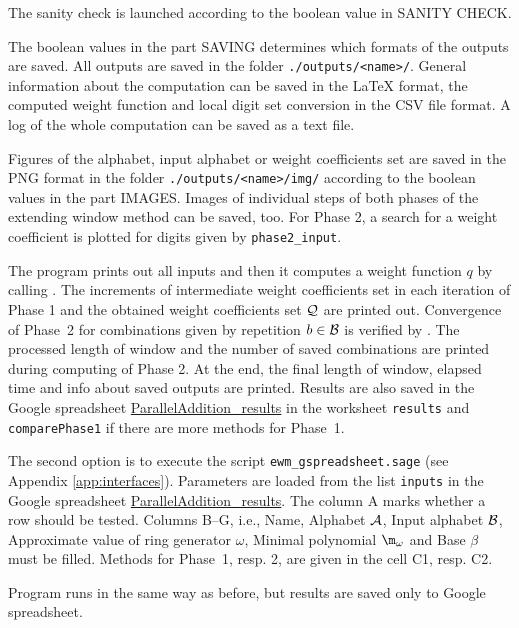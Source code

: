 The sanity check is launched according to the boolean value in SANITY CHECK. 

The boolean values in the part SAVING determines which formats of the outputs are saved. All outputs are saved in the folder \verb+./outputs/<name>/+. General information about the computation can be saved in the \LaTeX{} format, the computed weight function and local digit set conversion in the CSV file format.  A log of the whole computation can be saved as a text file.

Figures of the alphabet, input alphabet or weight coefficients set are saved in the PNG format in the folder \verb+./outputs/<name>/img/+ according to the boolean values in the part IMAGES. Images of individual steps of both phases of the extending window method can be saved, too. For Phase 2, a search for a weight coefficient  is plotted for digits given by \verb+phase2_input+.  

The program prints out all inputs and then it computes a weight function $q$ by calling . The increments of intermediate weight coefficients set in each iteration of Phase 1 and the obtained weight coefficients set $\mathcal{Q}$ are printed out. Convergence of Phase~2 for combinations given by repetition $b\in\mathcal{B}$ is verified by . The processed length of window and the number of saved combinations are printed during computing of Phase 2. At the end, the final length of window, elapsed time and info about saved outputs are printed. Results are also saved in the Google spreadsheet \href{https://docs.google.com/spreadsheets/d/1TnhrHdefHfHa0WSeVs4q6XVj3epjPlPlnoekE0E1xeM/edit?usp=sharing}{ParallelAddition\_results} in the worksheet \verb+results+ and \verb+comparePhase1+ if there are more methods for Phase~1.

The second option is to execute the script \verb+ewm_gspreadsheet.sage+ (see Appendix \ref{app:interfaces}). Parameters are loaded from the list \verb+inputs+ in the Google spreadsheet \href{https://docs.google.com/spreadsheets/d/1TnhrHdefHfHa0WSeVs4q6XVj3epjPlPlnoekE0E1xeM/edit?usp=sharing}{ParallelAddition\_results}. The column A marks whether a row should be tested. Columns B--G, i.e., Name, Alphabet $\mathcal{A}$, Input alphabet $\mathcal{B}$, Approximate value of ring generator $\omega$, Minimal polynomial $\m_\omega$ and Base $\beta$ must be filled. Methods for Phase~1, resp. 2, are given in the cell C1, resp. C2.

Program runs in the same way as before, but results are saved only to Google spreadsheet.